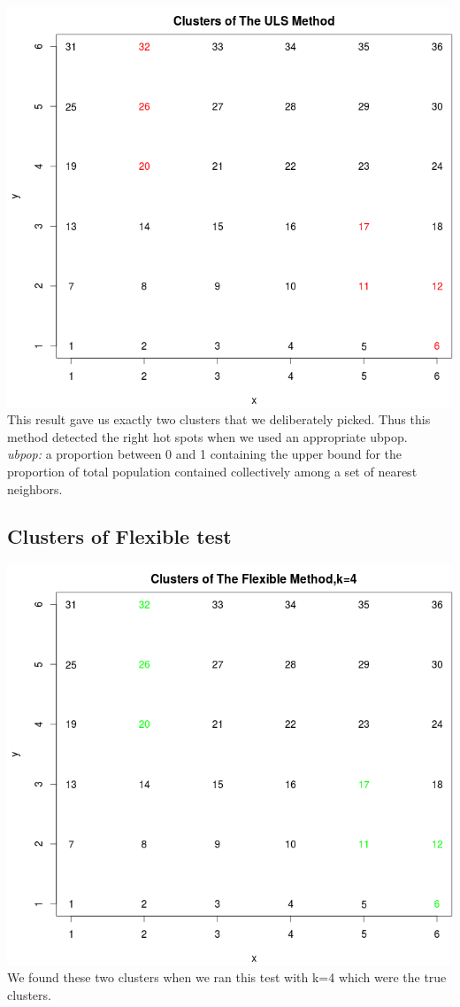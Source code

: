 \documentclass[12pt]{article}
\begin{document}
	 \includegraphics[scale=0.3]{test_2}\\ This result gave us exactly two clusters that we deliberately picked. Thus this method detected the right hot spots when we used an appropriate ubpop.  \\ 
	\textit{ubpop:} a proportion between 0 and 1 containing the upper bound for the proportion of total population contained collectively among a set of nearest neighbors.\\
	\subsection{Clusters of Flexible test} 
	 \includegraphics[scale=0.4]{test_3} \\ We found these two clusters when we ran this test with k=4 which were the true clusters.\\ 
\end{document}
